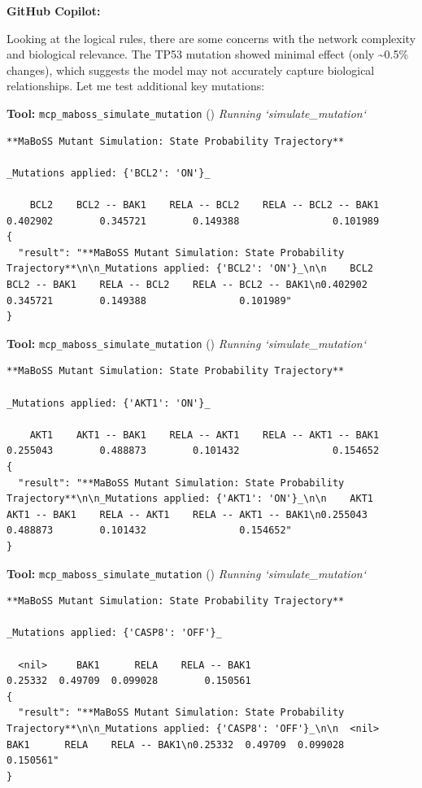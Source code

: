 \documentclass[11pt,a4paper]{article}
\begin{document}
\begin{copilotbox}
\textbf{GitHub Copilot:}

Looking at the logical rules, there are some concerns with the network complexity and biological relevance. The TP53 mutation showed minimal effect (only \textasciitilde{}0.5\% changes), which suggests the model may not accurately capture biological relationships. Let me test additional key mutations:

\end{copilotbox}
\begin{toolokbox}
\textbf{Tool:} \texttt{mcp\_maboss\_simulate\_mutation} (\checkmark)
\textit{Running `simulate\_mutation`}
\begin{lstlisting}
**MaBoSS Mutant Simulation: State Probability Trajectory**

_Mutations applied: {'BCL2': 'ON'}_

    BCL2    BCL2 -- BAK1    RELA -- BCL2    RELA -- BCL2 -- BAK1
0.402902        0.345721        0.149388                0.101989
{
  "result": "**MaBoSS Mutant Simulation: State Probability Trajectory**\n\n_Mutations applied: {'BCL2': 'ON'}_\n\n    BCL2    BCL2 -- BAK1    RELA -- BCL2    RELA -- BCL2 -- BAK1\n0.402902        0.345721        0.149388                0.101989"
}
\end{lstlisting}
\end{toolokbox}
\begin{toolokbox}
\textbf{Tool:} \texttt{mcp\_maboss\_simulate\_mutation} (\checkmark)
\textit{Running `simulate\_mutation`}
\begin{lstlisting}
**MaBoSS Mutant Simulation: State Probability Trajectory**

_Mutations applied: {'AKT1': 'ON'}_

    AKT1    AKT1 -- BAK1    RELA -- AKT1    RELA -- AKT1 -- BAK1
0.255043        0.488873        0.101432                0.154652
{
  "result": "**MaBoSS Mutant Simulation: State Probability Trajectory**\n\n_Mutations applied: {'AKT1': 'ON'}_\n\n    AKT1    AKT1 -- BAK1    RELA -- AKT1    RELA -- AKT1 -- BAK1\n0.255043        0.488873        0.101432                0.154652"
}
\end{lstlisting}
\end{toolokbox}
\begin{toolokbox}
\textbf{Tool:} \texttt{mcp\_maboss\_simulate\_mutation} (\checkmark)
\textit{Running `simulate\_mutation`}
\begin{lstlisting}
**MaBoSS Mutant Simulation: State Probability Trajectory**

_Mutations applied: {'CASP8': 'OFF'}_

  <nil>     BAK1      RELA    RELA -- BAK1
0.25332  0.49709  0.099028        0.150561
{
  "result": "**MaBoSS Mutant Simulation: State Probability Trajectory**\n\n_Mutations applied: {'CASP8': 'OFF'}_\n\n  <nil>     BAK1      RELA    RELA -- BAK1\n0.25332  0.49709  0.099028        0.150561"
}
\end{lstlisting}
\end{toolokbox}
\end{document}
